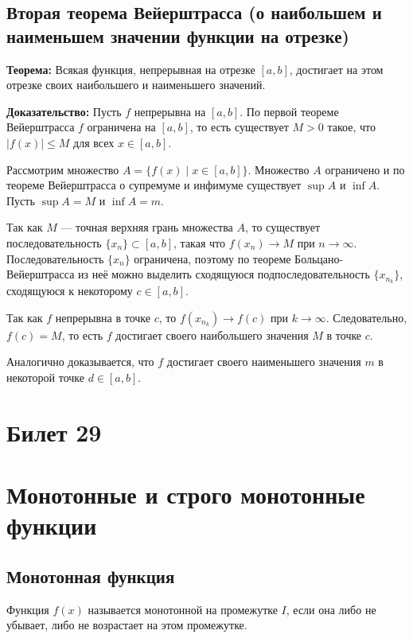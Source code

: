 \documentclass{article}
\begin{document}
\subsection*{Вторая теорема Вейерштрасса (о наибольшем и наименьшем значении функции на отрезке)}

\textbf{Теорема:} Всякая функция, непрерывная на отрезке \([a, b]\), достигает на этом отрезке своих наибольшего и наименьшего значений.

\textbf{Доказательство:} Пусть \( f \) непрерывна на \([a, b]\). По первой теореме Вейерштрасса \( f \) ограничена на \([a, b]\), то есть существует \( M > 0 \) такое, что \( |f(x)| \leq M \) для всех \( x \in [a, b] \).

Рассмотрим множество \( A = \{ f(x) \mid x \in [a, b] \} \). Множество \( A \) ограничено и по теореме Вейерштрасса о супремуме и инфимуме существует \( \sup A \) и \( \inf A \). Пусть \( \sup A = M \) и \( \inf A = m \).

Так как \( M \) — точная верхняя грань множества \( A \), то существует последовательность \( \{x_n\} \subset [a, b] \), такая что \( f(x_n) \to M \) при \( n \to \infty \). Последовательность \( \{x_n\} \) ограничена, поэтому по теореме Больцано-Вейерштрасса из неё можно выделить сходящуюся подпоследовательность \( \{x_{n_k}\} \), сходящуюся к некоторому \( c \in [a, b] \).

Так как \( f \) непрерывна в точке \( c \), то \( f(x_{n_k}) \to f(c) \) при \( k \to \infty \). Следовательно, \( f(c) = M \), то есть \( f \) достигает своего наибольшего значения \( M \) в точке \( c \).

Аналогично доказывается, что \( f \) достигает своего наименьшего значения \( m \) в некоторой точке \( d \in [a, b] \).

\section{Билет 29}

\section*{Монотонные и строго монотонные функции}

\subsection*{Монотонная функция}
Функция \( f(x) \) называется монотонной на промежутке \( I \), если она либо не убывает, либо не возрастает на этом промежутке.
\end{document}
